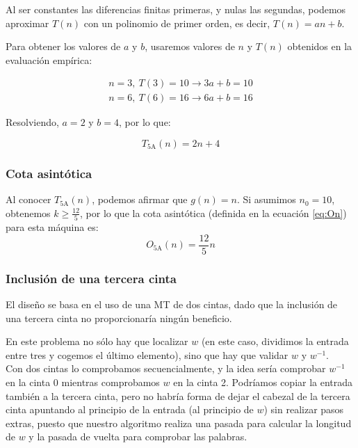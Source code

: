Al ser constantes las diferencias finitas primeras, y nulas las segundas, podemos aproximar $T(n)$ con un polinomio de primer orden, es decir, $T(n) = an + b$.\medskip

Para obtener los valores de $a$ y $b$, usaremos valores de $n$ y $T(n)$ obtenidos en la evaluación empírica:

\begin{subequations}
    \begin{gather}
        n = 3,\ T(3) = 10 \rightarrow 3a + b = 10 \\
        n = 6,\ T(6) = 16 \rightarrow 6a + b = 16
    \end{gather}
\end{subequations}

Resolviendo, $a=2$ y $b=4$, por lo que:

\begin{equation}
    T_{\mathrm{5A}}(n) = 2n + 4
\end{equation}


\subsubsection*{Cota asintótica}
Al conocer $T_{\mathrm{5A}}(n)$, podemos afirmar que $g(n) = n$. Si asumimos $n_0 = 10$, obtenemos $k \geq \frac{12}{5}$, por lo que la cota asintótica (definida en la ecuación \ref{eq:On}) para esta máquina es:
\begin{equation}
    O_{\mathrm{5A}}(n) = \frac{12}{5} n
\end{equation}



\subsubsection*{Inclusión de una tercera cinta}
El diseño se basa en el uso de una MT de dos cintas, dado que la inclusión de una tercera cinta no proporcionaría ningún beneficio.

En este problema no sólo hay que localizar $w$ (en este caso, dividimos la entrada entre tres y cogemos el último elemento), sino que hay que validar $w$ y $w^{-1}$.\\
Con dos cintas lo comprobamos secuencialmente, y la idea sería comprobar $w^{-1}$ en la cinta 0 mientras comprobamos $w$ en la cinta 2.
Podríamos copiar la entrada también a la tercera cinta, pero no habría forma de dejar el cabezal de la tercera cinta apuntando al principio de la entrada (al principio de $w$) sin realizar pasos extras, puesto que nuestro algoritmo realiza una pasada para calcular la longitud de $w$ y la pasada de vuelta para comprobar las palabras.



